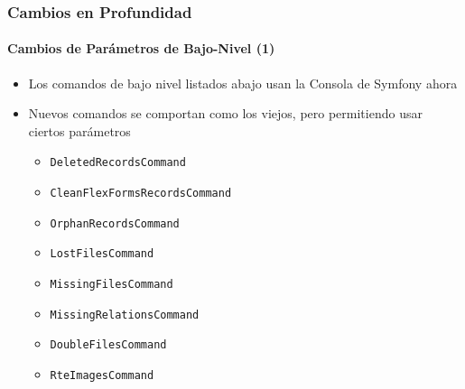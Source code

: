 \begin{frame}[fragile]
	\frametitle{Cambios en Profundidad}
	\framesubtitle{Cambios de Parámetros de Bajo-Nivel (1)}


	\begin{itemize}
		\item Los comandos de bajo nivel listados abajo usan la Consola de Symfony ahora
		\item Nuevos comandos se comportan como los viejos, pero permitiendo usar ciertos parámetros

			\begin{itemize}
				\item \texttt{DeletedRecordsCommand}
				\item \texttt{CleanFlexFormsRecordsCommand}
				\item \texttt{OrphanRecordsCommand}
				\item \texttt{LostFilesCommand}
				\item \texttt{MissingFilesCommand}
				\item \texttt{MissingRelationsCommand}
				\item \texttt{DoubleFilesCommand}
				\item \texttt{RteImagesCommand}
			\end{itemize}

	\end{itemize}

\end{frame}



